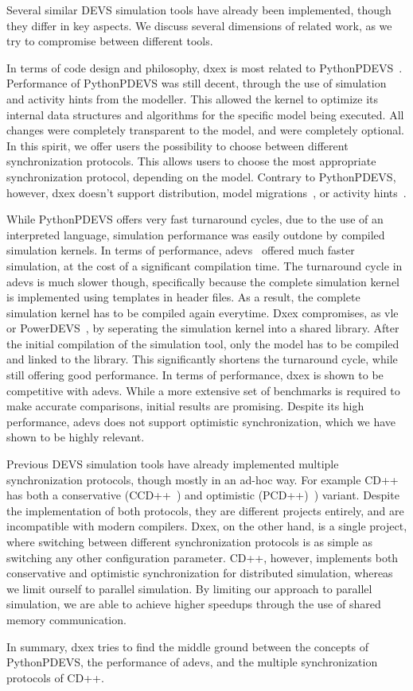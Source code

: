 Several similar \textsf{DEVS} simulation tools have already been implemented, though they differ in key aspects.
We discuss several dimensions of related work, as we try to compromise between different tools.

In terms of code design and philosophy, dxex is most related to PythonPDEVS~\cite{PythonPDEVS}.
Performance of PythonPDEVS was still decent, through the use of simulation and activity hints from the modeller.
This allowed the kernel to optimize its internal data structures and algorithms for the specific model being executed.
All changes were completely transparent to the model, and were completely optional.
In this spirit, we offer users the possibility to choose between different synchronization protocols.
This allows users to choose the most appropriate synchronization protocol, depending on the model.
Contrary to PythonPDEVS, however, dxex doesn't support distribution, model migrations~\cite{PythonPDEVS2}, or activity hints~\cite{PythonPDEVS_ACTIMS}.

While PythonPDEVS offers very fast turnaround cycles, due to the use of an interpreted language, simulation performance was easily outdone by compiled simulation kernels.
In terms of performance, adevs~\cite{adevs} offered much faster simulation, at the cost of a significant compilation time.
The turnaround cycle in adevs is much slower though, specifically because the complete simulation kernel is implemented using templates in header files.
As a result, the complete simulation kernel has to be compiled again everytime.
Dxex compromises, as vle~\cite{vle} or PowerDEVS~\cite{PowerDEVS}, by seperating the simulation kernel into a shared library.
After the initial compilation of the simulation tool, only the model has to be compiled and linked to the library.
This significantly shortens the turnaround cycle, while still offering good performance.
In terms of performance, dxex is shown to be competitive with adevs.
While a more extensive set of benchmarks is required to make accurate comparisons, initial results are promising.
Despite its high performance, adevs does not support optimistic synchronization, which we have shown to be highly relevant.

Previous \textsf{DEVS} simulation tools have already implemented multiple synchronization protocols, though mostly in an ad-hoc way.
For example CD++~\cite{CD++} has both a conservative (CCD++~\cite{CCD++}) and optimistic (PCD++)~\cite{PCD++}) variant.
Despite the implementation of both protocols, they are different projects entirely, and are incompatible with modern compilers.
Dxex, on the other hand, is a single project, where switching between different synchronization protocols is as simple as switching any other configuration parameter.
CD++, however, implements both conservative and optimistic synchronization for distributed simulation, whereas we limit ourself to parallel simulation.
By limiting our approach to parallel simulation, we are able to achieve higher speedups through the use of shared memory communication.

In summary, dxex tries to find the middle ground between the concepts of PythonPDEVS, the performance of adevs, and the multiple synchronization protocols of CD++.
